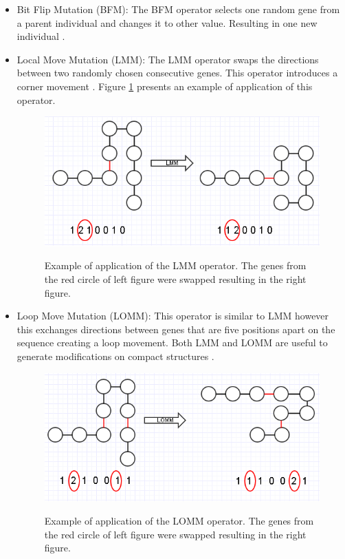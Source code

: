 \begin{itemize}
\begin{itemize}
		\item Bit Flip Mutation (BFM): The BFM operator selects one random gene from a parent individual and changes it to other value. Resulting in one new individual \cite{holland1975adaptation}.
		
		\item Local Move Mutation (LMM): The LMM operator swaps the directions between two randomly chosen consecutive genes. This operator introduces a corner movement \cite{bazzoli2004memetic}. Figure \ref{fig:operatorLMM} presents an example of application of this operator.
		
		
		
		\begin{figure}[htb!]
			\includegraphics[scale=.4,frame]{figures/operators/LMM.png}
			\label{fig:operatorLMM}
			\centering
			\caption{Example of application of the LMM operator. The genes from the red circle of left figure were swapped resulting in the right figure.} 
		\end{figure}
		
		\item Loop Move Mutation (LOMM): This operator is similar to LMM however this exchanges directions between genes that are five positions apart on the sequence creating a loop movement. Both LMM and LOMM are useful to generate modifications on compact structures \cite{custodio2014multiple}.
		
			\begin{figure}[htb!]
				\includegraphics[scale=.4,frame]{figures/operators/LOMM.png}
				\label{fig:operatorLOMM}
				\centering
				\caption{Example of application of the LOMM operator. The genes from the red circle of left figure were swapped resulting in the right figure.} 
			\end{figure}
		

\end{itemize}
\end{itemize}
